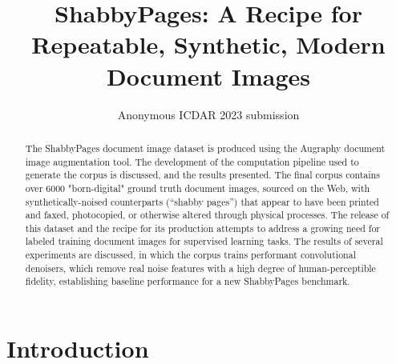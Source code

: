 \documentclass[runningheads]{llncs}
\begin{document}
\title{ShabbyPages: A Recipe for Repeatable, Synthetic, Modern Document Images}
%
%

\author{Anonymous ICDAR 2023 submission}


\maketitle

\begin{abstract}
The ShabbyPages document image dataset is produced using the Augraphy document image augmentation tool.
The development of the computation pipeline used to generate the corpus is discussed, and the results presented.
The final corpus contains over 6000 "born-digital" ground truth document images, sourced on the Web, with synthetically-noised counterparts (``shabby pages'') that appear to have been printed and faxed, photocopied, or otherwise altered through physical processes.
The release of this dataset and the recipe for its production attempts to address a growing need for labeled training document images for supervised learning tasks.
The results of several experiments are discussed, in which the corpus trains performant convolutional denoisers, which remove real noise features with a high degree of human-perceptible fidelity, establishing baseline performance for a new ShabbyPages benchmark.
\end{abstract}

\section{Introduction}
\end{document}

